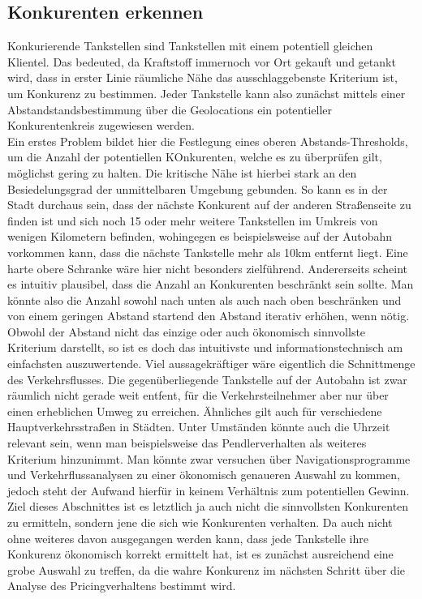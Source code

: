 \documentclass[12pt,a4paper,bibliography=totocnumbered,listof=totocnumbered]{scrartcl}
\begin{document}
\subsection{Konkurenten erkennen}

Konkurierende Tankstellen sind Tankstellen mit einem potentiell gleichen Klientel. Das bedeuted, da Kraftstoff immernoch vor Ort gekauft und getankt wird, dass in erster Linie räumliche Nähe das ausschlaggebenste Kriterium ist, um Konkurenz zu bestimmen. Jeder Tankstelle kann also zunächst mittels einer Abstandstandsbestimmung über die Geolocations ein potentieller Konkurentenkreis zugewiesen werden.\\

Ein erstes Problem bildet hier die Festlegung eines oberen Abstands-Thresholds, um die Anzahl der potentiellen KOnkurenten, welche es zu überprüfen gilt, möglichst gering zu halten. Die kritische Nähe ist hierbei stark an den Besiedelungsgrad der unmittelbaren Umgebung gebunden. So kann es in der Stadt durchaus sein, dass der nächste Konkurent auf der anderen Straßenseite zu finden ist und sich noch 15 oder mehr weitere Tankstellen im Umkreis von wenigen Kilometern befinden, wohingegen es beispielsweise auf der Autobahn vorkommen kann, dass die nächste Tankstelle mehr als 10km entfernt liegt. Eine harte obere Schranke wäre hier nicht besonders zielführend. Andererseits scheint es intuitiv plausibel, dass die Anzahl an Konkurenten beschränkt sein sollte. Man könnte also die Anzahl sowohl nach unten als auch nach oben beschränken und von einem geringen Abstand startend den Abstand iterativ erhöhen, wenn nötig.\\

Obwohl der Abstand nicht das einzige oder auch ökonomisch sinnvollste Kriterium darstellt, so ist es doch das intuitivste und informationstechnisch am einfachsten auszuwertende. Viel aussagekräftiger wäre eigentlich die Schnittmenge des Verkehrsflusses. Die gegenüberliegende Tankstelle auf der Autobahn ist zwar räumlich nicht gerade  weit entfent, für die Verkehrsteilnehmer aber nur über einen erheblichen Umweg zu erreichen. Ähnliches gilt auch für verschiedene Hauptverkehrsstraßen in Städten. Unter Umständen könnte auch die Uhrzeit relevant sein, wenn man beispielsweise das Pendlerverhalten als weiteres Kriterium hinzunimmt. Man könnte zwar versuchen über Navigationsprogramme und Verkehrflussanalysen zu einer ökonomisch genaueren Auswahl zu kommen, jedoch steht der Aufwand hierfür in keinem Verhältnis zum potentiellen Gewinn. Ziel dieses Abschnittes ist es letztlich ja auch nicht die sinnvollsten Konkurenten zu ermitteln, sondern jene die sich wie Konkurenten verhalten. Da auch nicht ohne weiteres davon ausgegangen werden kann, dass jede Tankstelle ihre Konkurenz ökonomisch korrekt ermittelt hat, ist es zunächst ausreichend eine grobe Auswahl zu treffen, da die wahre Konkurenz im nächsten Schritt über die Analyse des Pricingverhaltens bestimmt wird.\\
\end{document}
